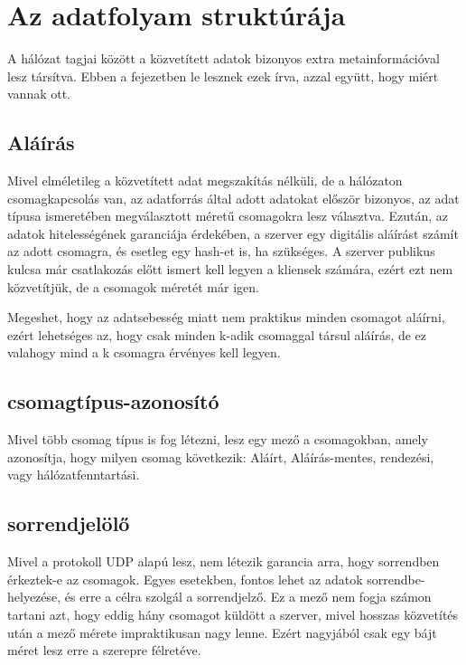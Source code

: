 \chapter{Az adatfolyam strukt\'ur\'aja}

A hálózat tagjai között a közvetített adatok bizonyos extra
metainformációval lesz társítva. Ebben a fejezetben le lesznek ezek írva,
azzal együtt, hogy miért vannak ott.

\section{Aláírás}

Mivel elméletileg a közvetített adat megszakítás nélküli, de a hálózaton
csomagkapcsolás van, az adatforrás által adott adatokat először bizonyos,
az adat típusa ismeretében megválasztott méretű csomagokra lesz választva.
Ezután, az adatok hitelességének garanciája érdekében, a szerver egy
digitális aláírást számít az adott csomagra, és esetleg egy hash-et is,
ha szükséges. A szerver publikus kulcsa már csatlakozás előtt ismert kell
legyen a kliensek számára, ezért ezt nem közvetítjük, de a csomagok
méretét már igen.

Megeshet, hogy az adatsebesség miatt nem praktikus minden csomagot
aláírni, ezért lehetséges az, hogy csak minden k-adik csomaggal társul
aláírás, de ez valahogy mind a k csomagra érvényes kell legyen.

\section{csomagtípus-azonosító}

Mivel több csomag típus is fog létezni, lesz egy mező a csomagokban,
amely azonosítja, hogy milyen csomag következik: Aláírt, Aláírás-mentes,
rendezési, vagy hálózatfenntartási.

\section{sorrendjelölő}

Mivel a protokoll UDP alapú lesz, nem létezik garancia arra, hogy
sorrendben érkeztek-e az csomagok. Egyes esetekben, fontos lehet az
adatok sorrendbe-helyezése, és erre a célra szolgál a sorrendjelző. 
Ez a mező nem fogja számon tartani azt, hogy eddig hány csomagot küldött
a szerver, mivel hosszas közvetítés után a mező mérete impraktikusan nagy
lenne. Ezért nagyjából csak egy bájt méret lesz erre a szerepre
félretéve.
